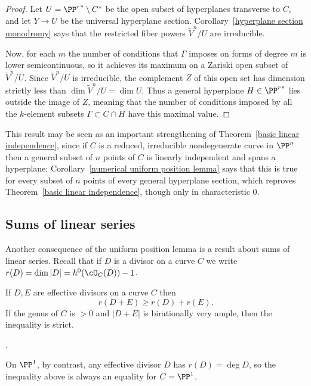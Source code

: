 \begin{proof} Let $U = {\PP^r}^* \setminus C^*$ be the open subset of hyperplanes transverse to $C$, and let $Y\to U$ be the universal hyperplane section.
Corollary~\ref{hyperplane section monodromy} says that the restricted fiber powers $\tilde V^n/U$ are irreducible.

Now, for each $m$ the number of conditions that $\Gamma$ imposes on forms of degree $m$ is lower semicontinuous, so it achieves its maximum on a Zariski open subset of $\tilde V^n/U$. Since $\tilde V^n/U$ is irreducible, the complement $Z$ of this open set has dimension strictly less than $\dim \tilde V^n/U = \dim U$. Thus a general hyperplane $H \in {\PP^r}^*$  lies outside the image of $Z$, meaning that the number of conditions imposed by all the $k$-element subsets $\Gamma \subset C \cap H$ have this maximal value.
\end{proof}

This result may be seen as an important strengthening of Theorem~\ref{basic linear independence}, since if $C$ is a reduced, irreducible nondegenerate curve in $\PP^n$ then a general subset of $n$ points of $C$ is linearly independent and spans a hyperplane; Corollary~\ref{numerical uniform position lemma} says that this is true for every subset of $n$ points of every general hyperplane section, 
which reproves Theorem~\ref{basic linear independence}, though only in characteristic 0. 

\subsection{Sums of linear series}

Another consequence of the uniform position lemma is a result about sums of linear series.
Recall that if $D$ is a divisor on a curve $C$ we write $r(D) = \dim |D| = h^0(\cO_C(D))-1$.

\begin{corollary}\label{Clifford equality plus}
If $D,E$ are effective divisors on a curve $C$ then
$$
r(D+E) \geq r(D)+r(E).
$$
If the genus of $C$ is $>0$ and $|D+E|$ is birationally very ample, then the inequality is strict.
\end{corollary}.

On $\PP^1$, by contrast, any effective divisor $D$ has $r(D) = \deg D$, so the inequality above is
always an equality for $C = \PP^1$.

